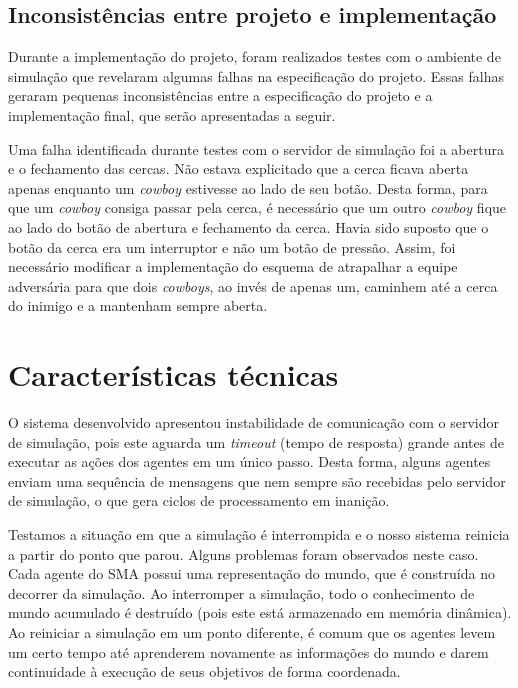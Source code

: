\documentclass{llncs}
\begin{document}
\subsection{Inconsistências entre projeto e implementação}

Durante a implementação do projeto, foram realizados testes com o ambiente de simulação que revelaram algumas falhas na especificação do projeto. Essas falhas geraram pequenas inconsistências entre a especificação do projeto e a implementação final, que serão apresentadas a seguir.

Uma falha identificada durante testes com o servidor de simulação foi a abertura e o fechamento das cercas. Não estava explicitado que a cerca ficava aberta apenas enquanto um \textit{cowboy} estivesse ao lado de seu botão. Desta forma, para que um \textit{cowboy} consiga passar pela cerca, é necessário que um outro \textit{cowboy} fique ao lado do botão de abertura e fechamento da cerca. Havia sido suposto que o botão da cerca era um interruptor e não um botão de pressão. Assim, foi necessário modificar a implementação do esquema de atrapalhar a equipe adversária para que dois \textit{cowboys}, ao invés de apenas um, caminhem até a cerca do inimigo e a mantenham sempre aberta.



\section{Características técnicas}


O sistema desenvolvido apresentou instabilidade de comunicação com o servidor de simulação, pois este aguarda um \textit{timeout} (tempo de resposta) grande antes de executar as ações dos agentes em um único passo. Desta forma, alguns agentes enviam uma sequência de mensagens que nem sempre são recebidas pelo servidor de simulação, o que gera ciclos de processamento em inanição.

Testamos a situação em que a simulação é interrompida e o nosso sistema reinicia a partir do ponto que parou. Alguns problemas foram observados neste caso. Cada agente do SMA possui uma representação do mundo, que é construída no decorrer da simulação. Ao interromper a simulação, todo o conhecimento de mundo acumulado é destruído (pois este está armazenado em memória dinâmica). Ao reiniciar a simulação em um ponto diferente, é comum que os agentes levem um certo tempo até aprenderem novamente as informações do mundo e darem continuidade à execução de seus objetivos de forma coordenada.
\end{document}
